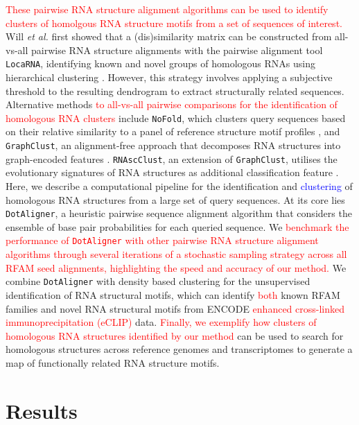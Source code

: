 \documentclass{bmcart}
\newcommand\dotaligner{\texttt{DotAligner}}
\newcommand\graphclust{\texttt{GraphClust}}
\newcommand\locarna{\texttt{LocaRNA}}
\begin{document}
\textcolor{red}{These pairwise RNA structure alignment algorithms can be used to identify 
clusters of homolgous RNA structure motifs from a set of sequences of interest.} 
Will \textit{et al.} \nocite{Will17432929} first showed that a (dis)similarity matrix can be 
constructed from all-vs-all pairwise RNA structure alignments with the pairwise alignment 
tool \locarna{}, identifying known and novel groups of homologous RNAs using hierarchical 
clustering \cite{Will17432929}. However, this strategy involves applying a subjective threshold 
to the resulting dendrogram to extract structurally related sequences. Alternative methods 
\textcolor{red}{to all-vs-all pairwise comparisons for the identification of homologous 
RNA clusters} include \texttt{NoFold}, which clusters query sequences based on their relative similarity 
to a panel of reference structure motif profiles \cite{Middleton25234928}, and \graphclust{}, 
an alignment-free approach that decomposes RNA structures into graph-encoded features 
\cite{Heyne22689765}. \texttt{RNAscClust}, an extension of \graphclust{}, utilises the 
evolutionary signatures of RNA structures as additional classification feature \cite{Miladi28334186}. \\

Here, we describe a computational pipeline for the identification and \textcolor{blue}{clustering} of
homologous RNA structures from a large set of query sequences. At its core lies \dotaligner{}, a
heuristic pairwise sequence alignment algorithm that considers the ensemble of 
base pair probabilities for each queried sequence. 
We \textcolor{red}{ benchmark the performance of \dotaligner{} with other pairwise 
RNA structure alignment algorithms through several iterations of a stochastic sampling 
strategy across all RFAM seed alignments, highlighting the speed and accuracy of our method.}  
We combine \dotaligner{} with density based clustering for the unsupervised identification of 
RNA structural motifs, which can identify \textcolor{red}{both} known RFAM families and novel RNA structural 
motifs from ENCODE \textcolor{red}{enhanced cross-linked immunoprecipitation (eCLIP)}  data. 
\textcolor{red}{Finally, we exemplify how clusters of homologous RNA structures identified 
by our method} can be used to search for homologous structures across reference genomes 
and transcriptomes to generate a map of functionally related RNA structure motifs.  

\section*{Results}
\end{document}
